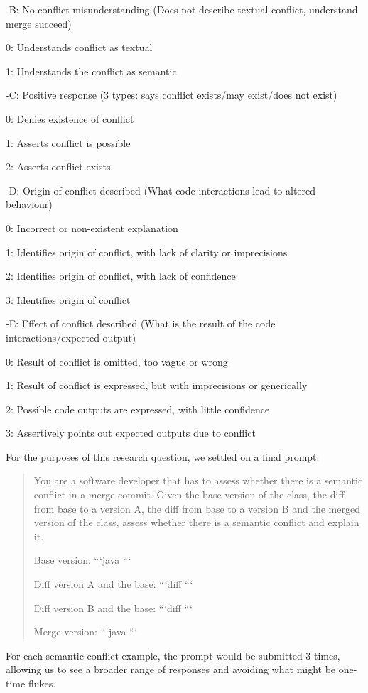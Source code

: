 -B: No conflict misunderstanding (Does not describe textual conflict, understand merge succeed)

0: Understands conflict as textual

1: Understands the conflict as semantic

-C: Positive response (3 types: says conflict exists/may exist/does not exist)

0: Denies existence of conflict

1: Asserts conflict is possible

2: Asserts conflict exists

-D: Origin of conflict described (What code interactions lead to altered behaviour)

0: Incorrect or non-existent explanation

1: Identifies origin of conflict, with lack of clarity or imprecisions

2: Identifies origin of conflict, with lack of confidence

3: Identifies origin of conflict

-E: Effect of conflict described (What is the result of the code interactions/expected output)

0: Result of conflict is omitted, too vague or wrong

1: Result of conflict is expressed, but with imprecisions or generically

2: Possible code outputs are expressed, with little confidence

3: Assertively points out expected outputs due to conflict

For the purposes of this research question, we settled on a final prompt:

\begin{quote}
You are a software developer that has to assess whether there is a semantic conflict in a merge commit.  Given the base version of the class, the diff from base to a version A, the diff from base to a version B and the merged version of the class, assess whether there is a semantic conflict and explain it.

Base version:
```java
```

Diff version A and the base:
```diff
```

Diff version B and the base:
```diff
```

Merge version:
```java
```

\end{quote}

For each semantic conflict example, the prompt would be submitted 3 times, allowing us to see a broader range of responses and avoiding what might be one-time flukes.

